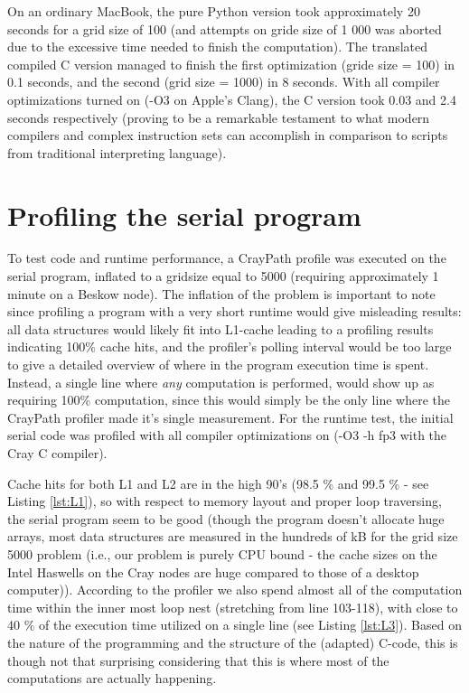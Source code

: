 \documentclass[12pt]{article}
\begin{document}
On an ordinary MacBook, the pure Python version took approximately 20 seconds for a grid size of 100 (and attempts on gride size of 1 000 was aborted due to the excessive time needed to finish the computation).  The translated compiled C version managed to finish the first optimization (gride size = 100) in 0.1 seconds, and the second (grid size = 1000) in 8 seconds. With all compiler optimizations turned on (-O3 on Apple's Clang), the C version took 0.03 and 2.4 seconds respectively (proving to be a remarkable testament to what modern compilers and complex instruction sets can accomplish in comparison to scripts from traditional interpreting language).

\section*{Profiling the serial program}
To test code and runtime performance, a CrayPath profile was executed on the serial program, inflated to a gridsize equal to 5000 (requiring approximately 1 minute on a Beskow node). The inflation of the problem is important to note since profiling a program with a very short runtime would give misleading results: all data structures would likely fit into L1-cache leading to a profiling results indicating 100\% cache hits, and the profiler's polling interval would be too large to give a detailed overview of where in the program execution time is spent. Instead, a single line where \emph{any} computation is performed, would show up as requiring 100\% computation, since this would simply be the only line where the CrayPath profiler made it's single measurement. For the runtime test, the initial serial code was profiled with all compiler optimizations on (-O3 -h fp3 with the Cray C compiler).

Cache hits for both L1 and L2 are in the high 90's (98.5 \% and 99.5 \% - see Listing \ref{lst:L1}), so with respect to memory layout and proper loop traversing,  the serial program seem to be good (though the program doesn't allocate huge arrays, most data structures are measured in the hundreds of kB for the grid size 5000 problem (i.e., our problem is purely CPU bound - the cache sizes on the Intel Haswells on the Cray nodes are huge compared to those of a desktop computer)). According to the profiler we also spend almost all of the computation time within the inner most loop nest (stretching from line 103-118), with close to 40 \% of the execution time utilized on a single line (see Listing \ref{lst:L3}).  Based on the nature of the programming and the structure of the (adapted) C-code, this is though not that surprising considering that this is where most of the computations are actually happening.
\end{document}
